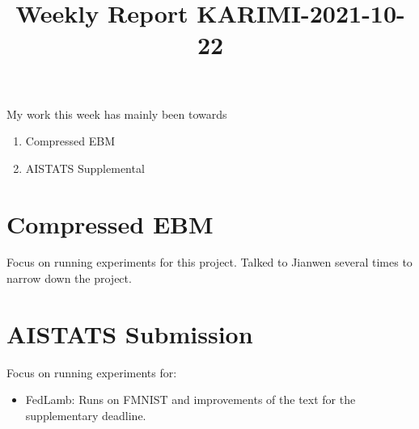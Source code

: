 \documentclass{article}
\begin{document}
\title{Weekly Report KARIMI-2021-10-22}


\date{}
\maketitle

\vspace{-0.5in}


My work this week has mainly been towards
\begin{enumerate}
\item Compressed EBM
\item AISTATS Supplemental
\end{enumerate}

\section{Compressed EBM}
Focus on running experiments for this project.
Talked to Jianwen several times to narrow down the project.



\section{AISTATS Submission}
Focus on running experiments for:
\begin{itemize}
\item FedLamb: Runs on FMNIST and improvements of the text for the supplementary deadline.
\end{itemize}
\end{document}
